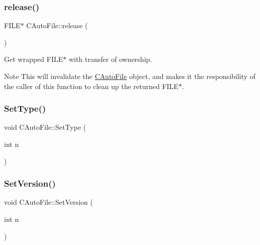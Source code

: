 \mbox{\label{class_c_auto_file_a25b51d94dc85c4140da0b15494ac9f8a}} 
\subsubsection{\texorpdfstring{release()}{release()}}
{\footnotesize\ttfamily F\+I\+LE$\ast$ C\+Auto\+File\+::release (\begin{DoxyParamCaption}{ }\end{DoxyParamCaption})\hspace{0.3cm}{\ttfamily [inline]}}

Get wrapped F\+I\+L\+E$\ast$ with transfer of ownership. \begin{DoxyNote}{Note}
This will invalidate the \mbox{\hyperlink{class_c_auto_file}{C\+Auto\+File}} object, and makes it the responsibility of the caller of this function to clean up the returned F\+I\+L\+E$\ast$. 
\end{DoxyNote}
\mbox{\label{class_c_auto_file_ac1a3986f191fe81384f58fc5fa073820}} 
\subsubsection{\texorpdfstring{Set\+Type()}{SetType()}}
{\footnotesize\ttfamily void C\+Auto\+File\+::\+Set\+Type (\begin{DoxyParamCaption}\item[{int}]{n }\end{DoxyParamCaption})\hspace{0.3cm}{\ttfamily [inline]}}

\mbox{\label{class_c_auto_file_a51f805bc470a95c9948250503b587aec}} 
\subsubsection{\texorpdfstring{Set\+Version()}{SetVersion()}}
{\footnotesize\ttfamily void C\+Auto\+File\+::\+Set\+Version (\begin{DoxyParamCaption}\item[{int}]{n }\end{DoxyParamCaption})\hspace{0.3cm}{\ttfamily [inline]}}

